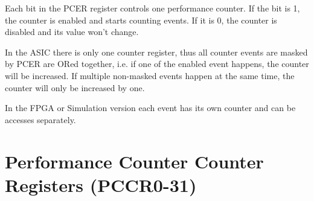 
Each bit in the PCER register controls one performance counter. If the bit is
1, the counter is enabled and starts counting events. If it is 0, the counter
is disabled and its value won't change.

In the ASIC there is only one counter register, thus all counter events are
masked by PCER are ORed together, i.e. if one of the enabled event happens,
the counter will be increased. If multiple non-masked events happen at the same
time, the counter will only be increased by one.

In the FPGA or Simulation version each event has its own counter and can be
accesses separately.


\section{Performance Counter Counter Registers (PCCR0-31)}


